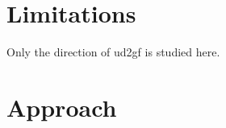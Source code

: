 \documentclass{article}
\begin{document}



\section{Limitations}

Only the direction of ud2gf is studied here. 



\section{Approach}







\end{document}
